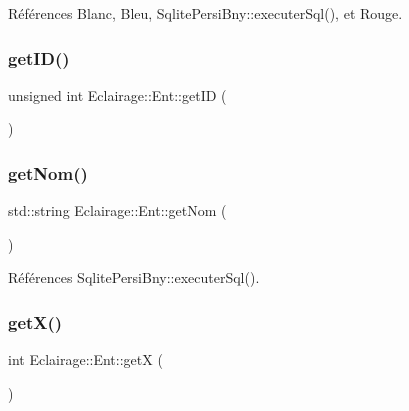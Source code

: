 Références Blanc, Bleu, Sqlite\+Persi\+Bny\+::executer\+Sql(), et Rouge.

\mbox{\label{classEclairage_1_1Ent_a503507f6dc76a84b54e22ef21d9f301d}} 
\subsubsection{\texorpdfstring{get\+I\+D()}{getID()}}
{\footnotesize\ttfamily unsigned int Eclairage\+::\+Ent\+::get\+ID (\begin{DoxyParamCaption}{ }\end{DoxyParamCaption})\hspace{0.3cm}{\ttfamily [virtual]}}

\mbox{\label{classEclairage_1_1Ent_ae440f0f45ec8f6d11e54c1a0ebe8d5c1}} 
\subsubsection{\texorpdfstring{get\+Nom()}{getNom()}}
{\footnotesize\ttfamily std\+::string Eclairage\+::\+Ent\+::get\+Nom (\begin{DoxyParamCaption}{ }\end{DoxyParamCaption})\hspace{0.3cm}{\ttfamily [virtual]}}



Références Sqlite\+Persi\+Bny\+::executer\+Sql().

\mbox{\label{classEclairage_1_1Ent_a0b54632cd5ff1bcb588c4f8527361990}} 
\subsubsection{\texorpdfstring{get\+X()}{getX()}}
{\footnotesize\ttfamily int Eclairage\+::\+Ent\+::getX (\begin{DoxyParamCaption}{ }\end{DoxyParamCaption})\hspace{0.3cm}{\ttfamily [virtual]}}



